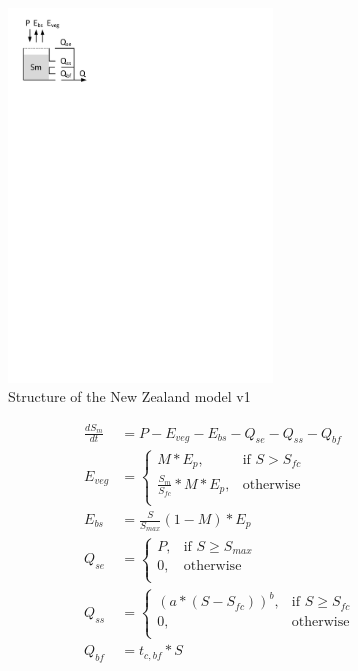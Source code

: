 { 																	%
\begin{figure}
\includegraphics[trim=1cm 24cm 10cm 1cm,width=7cm,keepaspectratio]{./AppA_files/04_schematic.pdf}
\caption{Structure of the New Zealand model v1} \label{fig:04_schematic}
\end{figure}

\begin{align}
	\frac{dS_m}{dt} &= P - E_{veg} - E_{bs}  - Q_{se} - Q_{ss} - Q_{bf}\\
	E_{veg} &= \begin{cases}
		M*E_p, &\text{if } S > S_{fc} \\
		\frac{S_m}{S_{fc}}*M*E_p, &\text{otherwise} \\
	\end{cases} \\
	E_{bs} &= \frac{S}{S_{max}}(1-M)*E_p \\
	Q_{se} &= \begin{cases}
		P, &\text{if } S \geq S_{max}\\
		0, &\text{otherwise}\\
	\end{cases}\\
	Q_{ss} &= \begin{cases}
		\left(a*(S-S_{fc})\right)^b, &\text{if } S \geq S_{fc} \\
		0, &\text{otherwise}\\
		\end{cases}\\
	Q_{bf} &= t_{c,bf}*S	
\end{align}

} %


